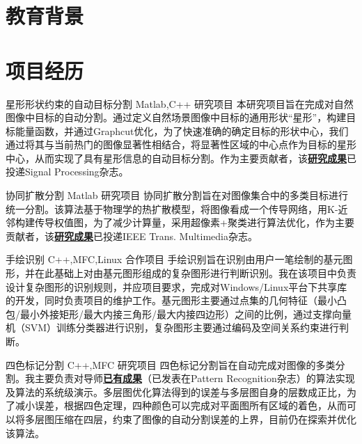 \documentclass[11pt,a4paper,sans]{moderncv}   %
\title{}                     %
\begin{document}
\begin{CJK}{UTF8}{gbsn}                       %
\maketitle

\section{教育背景}

\section{项目经历}
\renewcommand{\baselinestretch}{1.2}

{星形形状约束的自动目标分割}
{Matlab,C++}
{研究项目}{}
{本研究项目旨在完成对自然图像中目标的自动分割。通过定义自然场景图像中目标的通用形状“星形”，构建目标能量函数，并通过Graphcut优化，为了快速准确的确定目标的形状中心，我们通过将其与当前热门的图像显著性相结合，将显著性区域的中心点作为目标的星形中心，从而实现了具有星形信息的自动目标分割。作为主要贡献者，该\textbf{\href{http://files.cnblogs.com/moondark/XiangliLiao_SRAPC.pdf}{研究成果}}已投递Signal Processing杂志。}
\vspace*{0.2\baselineskip}

{协同扩散分割}
{Matlab}
{研究项目}{}
{协同扩散分割旨在对图像集合中的多类目标进行统一分割。该算法基于物理学的热扩散模型，将图像看成一个传导网络，用K-近邻构建传导权值图，为了减少计算量，采用超像素+聚类进行算法优化，作为主要贡献者，该\textbf{\href{http://files.cnblogs.com/moondark/XiangliLiao_CoDiffusion.pdf}{研究成果}}已投递IEEE Trans. Multimedia杂志。}
\vspace*{0.2\baselineskip}

{手绘识别}
{C++,MFC,Linux}
{合作项目}{}
{手绘识别旨在识别由用户一笔绘制的基元图形，并在此基础上对由基元图形组成的复杂图形进行判断识别。我在该项目中负责设计复杂图形的识别规则，并应项目要求，完成对Windows/Linux平台下共享库的开发，同时负责项目的维护工作。基元图形主要通过点集的几何特征（最小凸包/最小外接矩形/最大内接三角形/最大内接四边形）之间的比例，通过支撑向量机（SVM）训练分类器进行识别，复杂图形主要通过编码及空间关系约束进行判断。}
\vspace*{0.2\baselineskip}

{四色标记分割}
{C++,MFC}
{研究项目}{}
{四色标记分割旨在自动完成对图像的多类分割。我主要负责对导师\textbf{\href{http://www.sciencedirect.com/science/article/pii/S0031320311001907}{已有成果}}（已发表在Pattern Recognition杂志）的算法实现及算法的系统级演示。多层图优化算法得到的误差与多层图自身的层数成正比，为了减小误差，根据四色定理，四种颜色可以完成对平面图所有区域的着色，从而可以将多层图压缩在四层，约束了图像的自动分割误差的上界，目前仍在探索并优化该算法。}
\vspace*{0.2\baselineskip}


\end{CJK}
\end{document}
